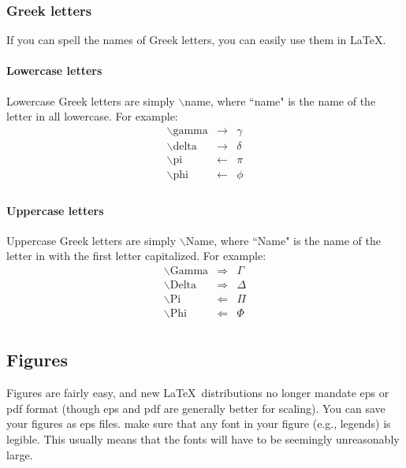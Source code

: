 \documentclass[12pt]{article}
\begin{document}
\subsubsection{Greek letters}
If you can spell the names of Greek letters, you can easily use them in \LaTeX. 

\paragraph{Lowercase letters}
Lowercase Greek letters are simply $\backslash$name, where ``name" is the name of the letter in all lowercase. For example:
\begin{eqnarray*}
\backslash\mbox{gamma} &\rightarrow& \gamma \\
\backslash\mbox{delta} &\rightarrow& \delta \\
\backslash\mbox{pi} &\leftarrow& \pi \\
\backslash\mbox{phi} &\leftarrow& \phi \\
\end{eqnarray*}

\paragraph{Uppercase letters}
Uppercase Greek letters are simply $\backslash$Name, where ``Name" is the name of the letter in with the first letter capitalized. For example:
\begin{eqnarray*}
\backslash\mbox{Gamma} &\Rightarrow& \Gamma \\
\backslash\mbox{Delta} &\Rightarrow& \Delta \\
\backslash\mbox{Pi} &\Leftarrow& \Pi \\
\backslash\mbox{Phi} &\Leftarrow& \Phi \\
\end{eqnarray*}


\subsection{Figures}
Figures are fairly easy, and new \LaTeX\ distributions no longer mandate eps or pdf format (though eps and pdf are generally better for scaling). You can save your figures as eps files. make sure that any font in your figure (e.g., legends) is legible. This usually means that the fonts will have to be seemingly unreasonably large.
\end{document}
